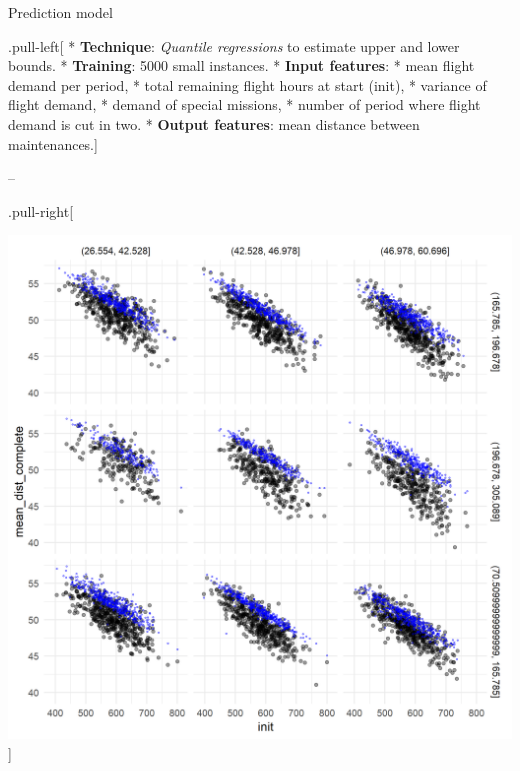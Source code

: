 \documentclass[usenames,dvipsnames]{beamer}
\begin{document}
\begin{frame}

\begin{block}{Prediction model}

.pull-left{[} * \textbf{Technique}: \emph{Quantile regressions} to
estimate upper and lower bounds. * \textbf{Training}: 5000 small
instances. * \textbf{Input features}: * mean flight demand per period, *
total remaining flight hours at start (init), * variance of flight
demand, * demand of special missions, * number of period where flight
demand is cut in two. * \textbf{Output features}: mean distance between
maintenances.{]}

--

.pull-right{[}

\includegraphics[width=1\linewidth]{QuantReg_mean_consum_upper_mean_dist_complete_IT000125_20190716}
{]}

\end{block}

\end{frame}
\end{document}
